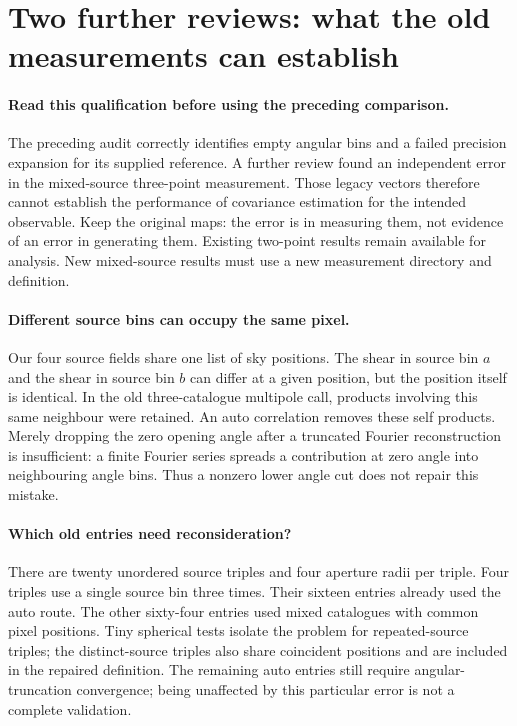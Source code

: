 \documentclass[11pt]{article}
\begin{document}
\section{Two further reviews: what the old measurements can establish}
\label{sec:review-repair}
\paragraph{Read this qualification before using the preceding comparison.}
The preceding audit correctly identifies empty angular bins and a failed
precision expansion for its supplied reference. A further review found
an independent error in the mixed-source three-point measurement. Those
legacy vectors therefore cannot establish the performance of covariance
estimation for the intended observable. Keep the original maps: the error
is in measuring them, not evidence of an error in generating them. Existing
two-point results remain available for analysis. New mixed-source results
must use a new measurement directory and definition.

\paragraph{Different source bins can occupy the same pixel.}
Our four source fields share one list of sky positions. The shear in source
bin $a$ and the shear in source bin $b$ can differ at a given position,
but the position itself is identical. In the old three-catalogue multipole
call, products involving this same neighbour were retained. An auto
correlation removes these self products. Merely dropping the zero opening
angle after a truncated Fourier reconstruction is insufficient: a finite
Fourier series spreads a contribution at zero angle into neighbouring
angle bins. Thus a nonzero lower angle cut does not repair this mistake.

\paragraph{Which old entries need reconsideration?}
There are twenty unordered source triples and four aperture radii per
triple. Four triples use a single source bin three times. Their sixteen
entries already used the auto route. The other sixty-four entries used
mixed catalogues with common pixel positions. Tiny spherical tests isolate
the problem for repeated-source triples; the distinct-source triples also
share coincident positions and are included in the repaired definition.
The remaining auto entries still require angular-truncation convergence;
being unaffected by this particular error is not a complete validation.
\end{document}
